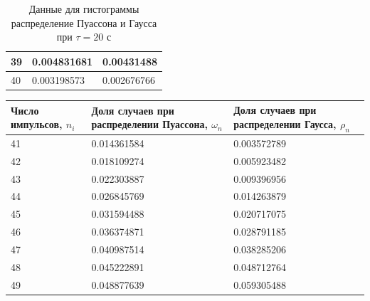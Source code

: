 \documentclass[a4paper]{article}
\begin{document}
\begin{table}[!h]
\begin{center}
\begin{tabular}{|l|l|l|}
39                       & 0.004831681                                           & 0.00431488                                        \\ \hline
40                       & 0.003198573                                           & 0.002676766                                       \\ \hline
\end{tabular}
\caption{Данные для гистограммы распределение Пуассона и Гаусса при $\tau = 20$ с}
\end{center}
\end{table}

\begin{table}[!h]
\begin{center}
\begin{tabular}{|l|l|l|}
\hline
Число импульсов, $n_{i}$ & Доля случаев при распределении Пуассона, $\omega_{n}$ & Доля случаев при распределении Гаусса, $\rho_{n}$ \\ \hline
41                       & 0.014361584                                           & 0.003572789                                       \\ \hline
42                       & 0.018109274                                           & 0.005923482                                       \\ \hline
43                       & 0.022303887                                           & 0.009396956                                       \\ \hline
44                       & 0.026845769                                           & 0.014263879                                       \\ \hline
45                       & 0.031594488                                           & 0.020717075                                       \\ \hline
46                       & 0.036374871                                           & 0.028791185                                       \\ \hline
47                       & 0.040987514                                           & 0.038285206                                       \\ \hline
48                       & 0.045222891                                           & 0.048712764                                       \\ \hline
49                       & 0.048877639                                           & 0.059305488                                       \\ \hline

\end{tabular}
\end{center}
\end{table}
\end{document}
